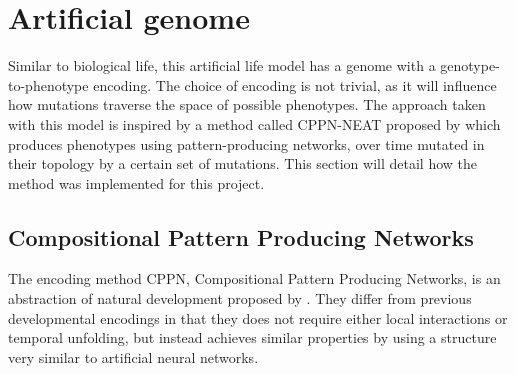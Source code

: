 \section{Artificial genome}
Similar to biological life, this artificial life model has a genome with a genotype-to-phenotype encoding. The choice of encoding is not trivial, as it will influence how mutations traverse the space of possible phenotypes. The approach taken with this model is inspired by a method called CPPN-NEAT proposed by \cite{stanley2007compositional} which produces phenotypes using pattern-producing networks, over time mutated in their topology by a certain set of mutations. This section will detail how the method was implemented for this project.

\subsection{Compositional Pattern Producing Networks} \label{subsec:CPPN}
The encoding method CPPN, Compositional Pattern Producing Networks, is an abstraction of natural development proposed by \cite{stanley2007compositional}. They differ from previous developmental encodings in that they does not require either local interactions or temporal unfolding, but instead achieves similar properties by using a structure very similar to artificial neural networks.

